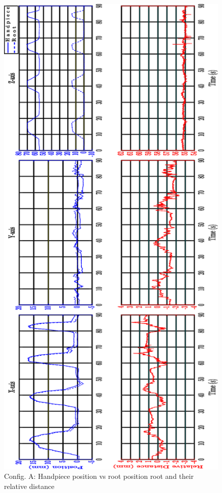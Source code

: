 \begin{figure}[htbp]
\begin{center}
\includegraphics[width=0.7\linewidth]{Images/exp/ConfigA_1.eps}
\caption{Config. A: Handpiece position vs root position root and their relative distance}
\label{fig: exp1_1_1}
\end{center}
\end{figure}	
	
